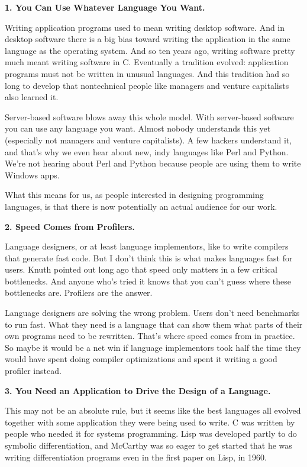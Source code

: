 \documentclass[12pt]{book}
\begin{document}
\textbf{1. You Can Use Whatever Language You Want.}

Writing application programs used to mean writing desktop software. And
in desktop software there is a big bias toward writing the application
in the same language as the operating system. And so ten years ago,
writing software pretty much meant writing software in C. Eventually a
tradition evolved: application programs must not be written in unusual
languages. And this tradition had so long to develop that nontechnical
people like managers and venture capitalists also learned it.

Server-based software blows away this whole model. With server-based
software you can use any language you want. Almost nobody understands
this yet (especially not managers and venture capitalists). A few
hackers understand it, and that's why we even hear about new, indy
languages like Perl and Python. We're not hearing about Perl and Python
because people are using them to write Windows apps.

What this means for us, as people interested in designing programming
languages, is that there is now potentially an actual audience for our
work.

\textbf{2. Speed Comes from Profilers.}

Language designers, or at least language implementors, like to write
compilers that generate fast code. But I don't think this is what makes
languages fast for users. Knuth pointed out long ago that speed only
matters in a few critical bottlenecks. And anyone who's tried it knows
that you can't guess where these bottlenecks are. Profilers are the
answer.

Language designers are solving the wrong problem. Users don't need
benchmarks to run fast. What they need is a language that can show them
what parts of their own programs need to be rewritten. That's where
speed comes from in practice. So maybe it would be a net win if language
implementors took half the time they would have spent doing compiler
optimizations and spent it writing a good profiler instead.

\textbf{3. You Need an Application to Drive the Design of a Language.}

This may not be an absolute rule, but it seems like the best languages
all evolved together with some application they were being used to
write. C was written by people who needed it for systems programming.
Lisp was developed partly to do symbolic differentiation, and McCarthy
was so eager to get started that he was writing differentiation programs
even in the first paper on Lisp, in 1960.
\end{document}
